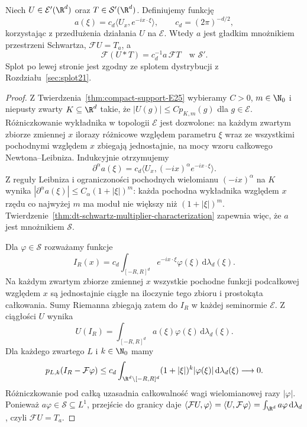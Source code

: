 \begin{twierdzenie}
\label{thm:dt-tempered-compact-convolution}
Niech $U\in\mathcal E'(\R^d)$ oraz $T\in\mathcal S'(\R^d)$.
Definiujemy funkcję
\[
 a(\xi)=c_d\langle U_x,e^{-ix\cdot\xi}\rangle,
 \qquad c_d=(2\pi)^{-d/2},
\]
korzystając z przedłużenia działania $U$ na $\mathcal E$.
Wtedy $a$ jest gładkim mnożnikiem przestrzeni Schwartza,
$\mathcal F U=T_a$, a
\[
 \mathcal F(U*T)=c_d^{-1}a\,\mathcal F T
 \quad\text{w }\mathcal S'.
\]
Splot po lewej stronie jest zgodny ze splotem
dystrybucji z Rozdziału~\ref{sec:splot21}.
\end{twierdzenie}
\begin{proof}
Z Twierdzenia~\ref{thm:compact-support-E25} wybieramy
$C>0$, $m\in\N_0$ i niepusty zwarty $K\subseteq\R^d$
takie, że $|U(g)|\le C p_{K,m}(g)$ dla $g\in\mathcal E$.
Różniczkowanie wykładnika w topologii $\mathcal E$
jest dozwolone: na każdym zwartym zbiorze zmiennej $x$
ilorazy różnicowe względem parametru $\xi$ wraz ze
wszystkimi pochodnymi względem $x$ zbiegają jednostajnie,
na mocy wzoru całkowego Newtona--Leibniza. Indukcyjnie
otrzymujemy
\[
 \partial^\alpha a(\xi)
 =c_d\langle U_x,(-ix)^\alpha e^{-ix\cdot\xi}\rangle.
\]
Z reguły Leibniza i ograniczoności pochodnych wielomianu
$(-ix)^\alpha$ na $K$ wynika
$|\partial^\alpha a(\xi)|\le C_\alpha(1+|\xi|)^m$:
każda pochodna wykładnika względem $x$ rzędu co najwyżej
$m$ ma moduł nie większy niż $(1+|\xi|)^m$.
Twierdzenie~\ref{thm:dt-schwartz-multiplier-characterization}
zapewnia więc, że $a$ jest mnożnikiem $\mathcal S$.

Dla $\varphi\in\mathcal S$ rozważamy funkcje
\[
 I_R(x)=c_d\int_{[-R,R]^d} e^{-ix\cdot\xi}\varphi(\xi)
 \,\mathrm d\lambda_d(\xi).
\]
Na każdym zwartym zbiorze zmiennej $x$ wszystkie pochodne
funkcji podcałkowej względem $x$ są jednostajnie ciągłe
na iloczynie tego zbioru i prostokąta całkowania.
Sumy Riemanna zbiegają zatem do $I_R$ w każdej
seminormie $\mathcal E$.
Z ciągłości $U$ wynika
\[
 U(I_R)=\int_{[-R,R]^d}a(\xi)\varphi(\xi)\,
 \mathrm d\lambda_d(\xi).
\]
Dla każdego zwartego $L$ i $k\in\N_0$ mamy
\[
 p_{L,k}(I_R-\mathcal F\varphi)
 \le c_d\int_{\R^d\setminus[-R,R]^d}
 (1+|\xi|)^k|\varphi(\xi)|\,\mathrm d\lambda_d(\xi)
 \longrightarrow0.
\]
Różniczkowanie pod całką uzasadnia całkowalność
wagi wielomianowej razy $|\varphi|$.
Ponieważ $a\varphi\in\mathcal S\subseteq L^1$,
przejście do granicy daje
$\langle\mathcal FU,\varphi\rangle
=\langle U,\mathcal F\varphi\rangle
=\int_{\R^d}a\varphi\,\mathrm d\lambda_d$,
czyli $\mathcal FU=T_a$.


\end{proof}
